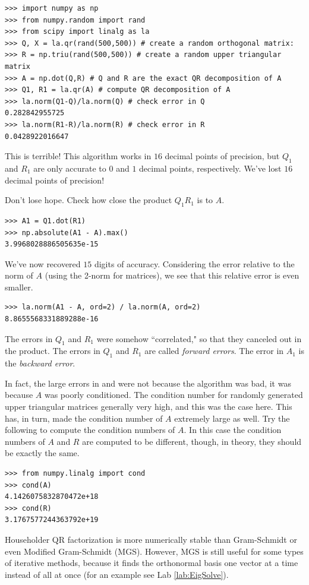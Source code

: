 \begin{lstlisting}
>>> import numpy as np
>>> from numpy.random import rand
>>> from scipy import linalg as la
>>> Q, X = la.qr(rand(500,500)) # create a random orthogonal matrix:
>>> R = np.triu(rand(500,500)) # create a random upper triangular matrix
>>> A = np.dot(Q,R) # Q and R are the exact QR decomposition of A
>>> Q1, R1 = la.qr(A) # compute QR decomposition of A
>>> la.norm(Q1-Q)/la.norm(Q) # check error in Q
0.282842955725
>>> la.norm(R1-R)/la.norm(R) # check error in R
0.0428922016647
\end{lstlisting}
This is terrible!
This algorithm works in $16$ decimal points of precision, but $Q_1$ and $R_1$ are only accurate to $0$ and $1$ decimal points, respectively.
We've lost $16$ decimal points of precision!

Don't lose hope.
Check how close the product $Q_1 R_1$ is to $A$.
\begin{lstlisting}
>>> A1 = Q1.dot(R1)
>>> np.absolute(A1 - A).max()
3.9968028886505635e-15
\end{lstlisting}
We've now recovered $15$ digits of accuracy.
Considering the error relative to the norm of $A$ (using the 2-norm for matrices), we see that this relative error is even smaller.
\begin{lstlisting}
>>> la.norm(A1 - A, ord=2) / la.norm(A, ord=2)
8.8655568331889288e-16
\end{lstlisting}
The errors in $Q_1$ and $R_1$ were somehow ``correlated," so that they canceled out in the product.
The errors in $Q_1$ and $R_1$ are called \emph{forward errors}.
The error in $A_1$ is the \emph{backward error}.

In fact, the large errors in  and  were not because the algorithm was bad, it was because $A$ was poorly conditioned.
The condition number for randomly generated upper triangular matrices generally very high, and this was the case here.
This has, in turn, made the condition number of $A$ extremely large as well.
Try the following to compute the condition numbers of $A$.
In this case the condition numbers of $A$ and $R$ are computed to be different, though, in theory, they should be exactly the same.
\begin{lstlisting}
>>> from numpy.linalg import cond
>>> cond(A)
4.1426075832870472e+18
>>> cond(R)
3.1767577244363792e+19
\end{lstlisting}

Householder QR factorization is more numerically stable than Gram-Schmidt or even Modified Gram-Schmidt (MGS).
However, MGS is still useful for some types of iterative methods, because it finds the orthonormal basis one vector at a time instead of all at once (for an example see Lab \ref{lab:EigSolve}).

